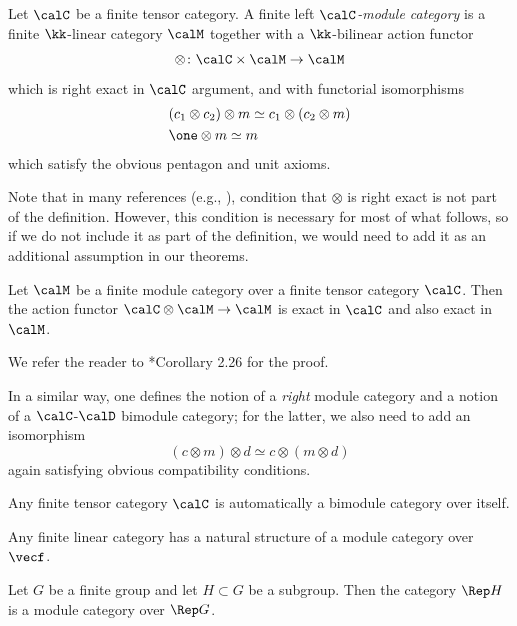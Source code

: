 \begin{definition}\label{d:module-cat}
  Let $\calC$ be a finite tensor category. A finite left \emph{$\calC$-module
  category} is a finite $\kk$-linear category $\calM$
  together with a $\kk$-bilinear action functor
  $$
  \otimes\colon \calC \times \calM \to \calM
  $$
  which is right exact in $\calC$ argument, and with functorial isomorphisms
  \begin{align*}
  &(c_1\otimes c_2)\otimes m \simeq c_1 \otimes (c_2\otimes m)\\
  & \one \otimes m \simeq m
  \end{align*}
  which satisfy the obvious pentagon and unit axioms.
\end{definition}
Note that in many references (e.g., ), condition that
$\otimes$ is right exact is not part of the definition. However, this condition
is necessary for most of what follows, so if we do not include it as part of the
definition, we would need to add it as an additional assumption in our theorems.
\begin{theorem}\label{t:module-action-exact}
  Let $\calM$ be a finite module category over a finite tensor category $\calC$.
  Then the action functor $\calC\otimes \calM\to\calM$ is exact in
  $\calC$ and also exact in $\calM$.
\end{theorem}
We refer the reader to *{Corollary 2.26} for the proof.

In a similar way, one defines the notion of a \emph{right} module category and a
notion of a $\calC$-$\calD$ bimodule category; for the latter, we also need to add
an isomorphism
$$
  (c\otimes m)\otimes d \simeq c\otimes (m\otimes d)
$$
again satisfying obvious compatibility conditions.

\begin{example}\label{x:tensor-self-bimodule}
  Any finite tensor category $\calC$ is automatically a bimodule category
  over itself.
\end{example}

\begin{example}\label{x:linear-cat-module}
  Any finite linear category has a natural structure of a module category over
  $\vecf$.
\end{example}

\begin{example}\label{x:coset-module}
  Let $G$ be a finite group and let $H\subset G$ be a subgroup. Then the
  category $\Rep H$ is a module category over $\Rep G$.
\end{example}

